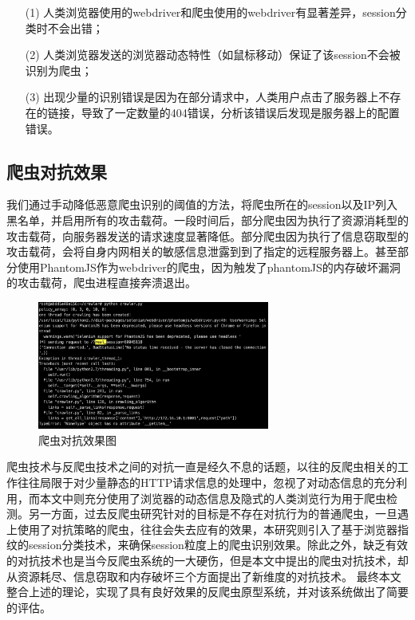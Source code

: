 \documentclass[doctor,privacy,twoside]{buaa_mac}
\begin{document}
\begin{itemize}
\item[(1)] 人类浏览器使用的webdriver和爬虫使用的webdriver有显著差异，session分类时不会出错；
\item[(2)] 人类浏览器发送的浏览器动态特性（如鼠标移动）保证了该session不会被识别为爬虫；
\item[(3)] 出现少量的识别错误是因为在部分请求中，人类用户点击了服务器上不存在的链接，导致了一定数量的404错误，分析该错误后发现是服务器上的配置错误。
\end{itemize}


\subsection{爬虫对抗效果}
我们通过手动降低恶意爬虫识别的阈值的方法，将爬虫所在的session以及IP列入黑名单，并启用所有的攻击载荷。一段时间后，部分爬虫因为执行了资源消耗型的攻击载荷，向服务器发送的请求速度显著降低。部分爬虫因为执行了信息窃取型的攻击载荷，会将自身内网相关的敏感信息泄露到到了指定的远程服务器上。甚至部分使用PhantomJS作为webdriver的爬虫，因为触发了phantomJS的内存破坏漏洞的攻击载荷，爬虫进程直接奔溃退出。

\centerline{}
\begin{figure}[!h]
  \centering
  \includegraphics[width=0.68\textwidth]{images/crash_crawler.png}
  \caption{爬虫对抗效果图}
  \label{fig:logo}
\end{figure}
\centerline{}


%

%

%
\summary

爬虫技术与反爬虫技术之间的对抗一直是经久不息的话题，以往的反爬虫相关的工作往往局限于对少量静态的HTTP请求信息的处理中，忽视了对动态信息的充分利用，而本文中则充分使用了浏览器的动态信息及隐式的人类浏览行为用于爬虫检测。另一方面，过去反爬虫研究针对的目标是不存在对抗行为的普通爬虫，一旦遇上使用了对抗策略的爬虫，往往会失去应有的效果，本研究则引入了基于浏览器指纹的session分类技术，来确保session粒度上的爬虫识别效果。除此之外，缺乏有效的对抗技术也是当今反爬虫系统的一大硬伤，但是本文中提出的爬虫对抗技术，却从资源耗尽、信息窃取和内存破坏三个方面提出了新维度的对抗技术。 最终本文整合上述的理论，实现了具有良好效果的反爬虫原型系统，并对该系统做出了简要的评估。
\end{document}
